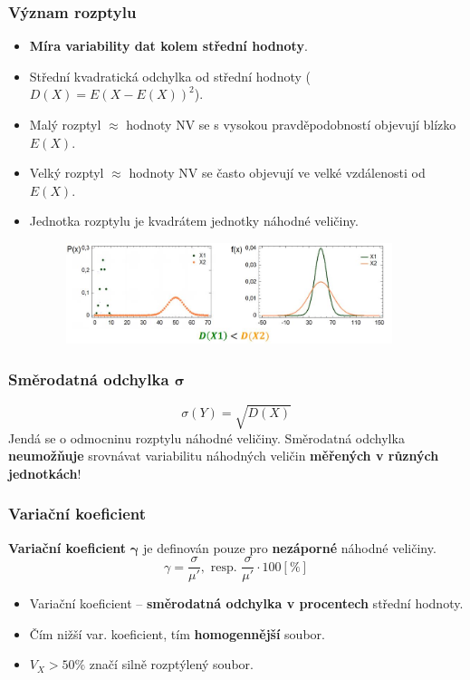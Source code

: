 \subsubsection{Význam rozptylu}
\begin{itemize}
	\item \textbf{Míra variability dat kolem střední hodnoty}.
	\item Střední kvadratická odchylka od střední hodnoty ($D(X) = E(X - E(X))^2$).
	\item Malý rozptyl $\approx$ hodnoty NV se s vysokou pravděpodobností objevují blízko $E(X)$.
	\item Velký rozptyl $\approx$ hodnoty NV se často objevují ve velké vzdálenosti od $E(X)$.
	\item Jednotka rozptylu je kvadrátem jednotky náhodné veličiny.
	\begin{figure}[H]
			\centering
			\includegraphics[width=0.9\textwidth]{assets/11_rozptyl}
	\end{figure}
\end{itemize}

\subsubsection{Směrodatná odchylka $\mathbf{\sigma}$}
$$\sigma(Y) = \sqrt{D(X)}$$
Jendá se o odmocninu rozptylu náhodné veličiny. Směrodatná odchylka \textbf{neumožňuje} srovnávat variabilitu náhodných veličin \textbf{měřených v různých jednotkách}! 

\subsubsection{Variační koeficient}
\textbf{Variační koeficient} $\mathbf{\gamma}$ je definován pouze pro \textbf{nezáporné} náhodné veličiny. $$\gamma = \frac{\sigma}{\mu'}, \textrm{ resp. } \frac{\sigma}{\mu'} \cdot 100 [\%]$$
\begin{itemize}
	\item Variační koeficient -- \textbf{směrodatná odchylka v procentech} střední hodnoty.
	\item Čím nižší var. koeficient, tím \textbf{homogennější} soubor.
	\item $V_X > 50\%$ značí silně rozptýlený soubor.
\end{itemize}